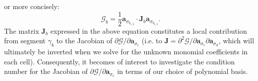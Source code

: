 or more concisely:
\begin{equation}
        \mathcal{G}_b = \frac{1}{2} \mathbf{a}_{\sigma_{b_{1,2}}} \cdot \mathbf{J}_b \mathbf{a}_{\sigma_{b_{1,2}}}.
\end{equation}
The matrix $\mathbf{J}_b$ expressed in the above equation constitutes a local contribution from segment $\gamma_b$ to the Jacobian of $\partial \mathcal{G} / \partial \mathbf{a}_{\sigma_c}$ (i.e. to $\mathbf{J} = \partial^2 \mathcal{G} / \partial \mathbf{a}_{\sigma_c} \partial \mathbf{a}_{\sigma_d}$, which will ultimately be inverted when we solve for the unknown monomial coefficients in each cell). Consequently, it becomes of interest to investigate the condition number for the Jacobian of $\partial \mathcal{G} / \partial \mathbf{a}_{\sigma_c}$ in terms of our choice of polynomial basis.


